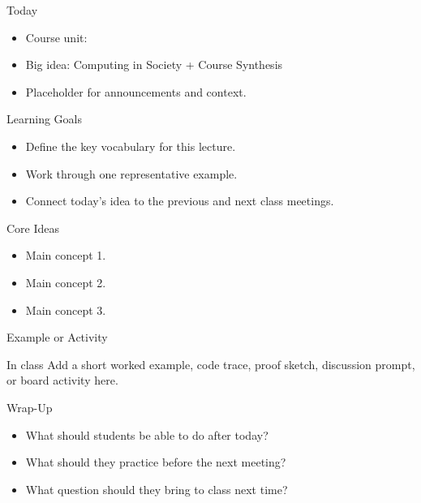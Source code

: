 \documentclass[aspectratio=169]{beamer}
\begin{document}
\makedecktitle

\begin{frame}{Today}
  \begin{itemize}
    \item Course unit: \CourseUnit
    \item Big idea: Computing in Society + Course Synthesis
    \item Placeholder for announcements and context.
  \end{itemize}
\end{frame}

\begin{frame}{Learning Goals}
  \begin{itemize}
    \item Define the key vocabulary for this lecture.
    \item Work through one representative example.
    \item Connect today's idea to the previous and next class meetings.
  \end{itemize}
\end{frame}

\begin{frame}{Core Ideas}
  \placeholdernote
  \begin{itemize}
    \item Main concept 1.
    \item Main concept 2.
    \item Main concept 3.
  \end{itemize}
\end{frame}

\begin{frame}{Example or Activity}
  \begin{block}{In class}
    Add a short worked example, code trace, proof sketch, discussion prompt, or board activity here.
  \end{block}
\end{frame}

\begin{frame}{Wrap-Up}
  \begin{itemize}
    \item What should students be able to do after today?
    \item What should they practice before the next meeting?
    \item What question should they bring to class next time?
  \end{itemize}
\end{frame}
\end{document}
